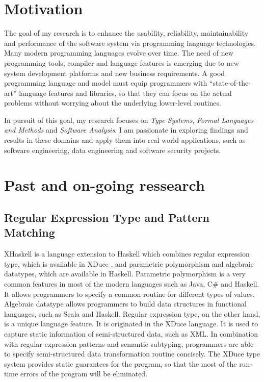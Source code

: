 \documentclass[12pt]{article}
\theoremstyle{plain} \numberwithin{equation}{section}
\theoremstyle{definition}
\newcommand{\kl}[1]{}
\begin{document}
\raisebox{1cm}



\section{Motivation}

\kl{What is the goal of my research?}
The goal of my research is to enhance the usability, reliability, 
maintainability and performance of the software system via programming language
technologies. Many modern programming languages evolve over time.
The need of new programming tools, compiler and  language features is 
emerging due to new system development platforms and new 
business requirements. A good programming language and model must equip
programmers with ``state-of-the-art'' language features
and libraries, so that they can focus on the actual problems without
worrying about the underlying lower-level routines.


\kl{What is the focus?}
In pursuit of this goal, my research focuses on
{\em Type Systems},  {\em Formal Languages and Methods} and {\em Software Analysis}.
I am passionate in exploring findings and results in these domains and apply them
into real world applications,
such as software engineering, data engineering and software security projects.


\section{Past and on-going ressearch}

\subsection{Regular Expression Type and Pattern Matching}
XHaskell is a language extension to Haskell \cite{xhaskell} 
which combines regular expression type, 
which is available in XDuce \cite{XDuceTyPHD}, and parametric
polymorphism and algebraic datatypes, which are available in Haskell.
Parametric polymorphism is a very common features in most of the 
modern languages such as Java, C\# and Haskell. It allows programmers to specify a
common routine for different types of values. Algebraic datatype
allows programmers to build data structures in functional languages,
such as Scala and Haskell. Regular expression
type, on the other hand, is a unique language feature. 
It is originated in the XDuce language. It is used to capture
static information of semi-structured data, such as XML. In
combination with regular expression patterns and semantic subtyping,
programmers are able to specify semi-structured data transformation routine concisely.
The XDuce type system provides static guarantees for the program, so that
the most of the run-time errors of the program will be eliminated.
\end{document}
